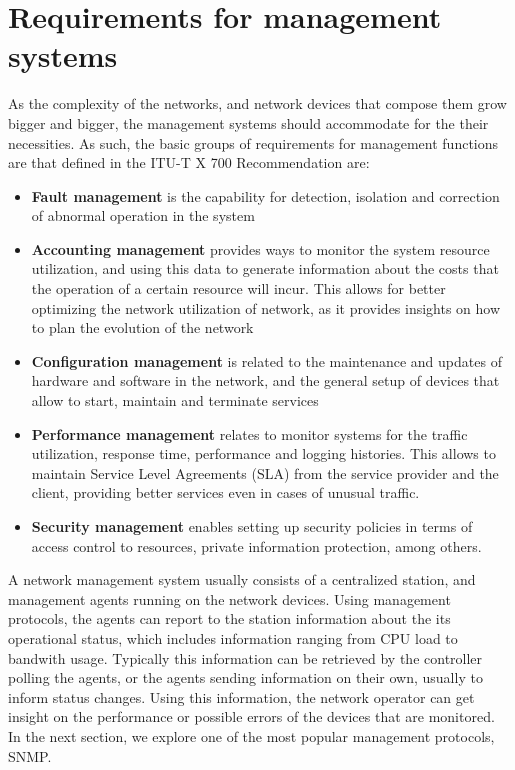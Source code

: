 \section {Requirements for management systems}

\par As the complexity of the networks, and network devices that compose them grow bigger and bigger, the management systems should accommodate for the their necessities. As such, the basic groups of requirements for management 
functions are that defined in the ITU-T X 700 Recommendation \cite {CITE - ITU T Recomendation} are:

\begin {itemize}
    \item \textbf {Fault management} is the capability for detection, isolation and correction of abnormal operation in the system
    \item \textbf {Accounting management} provides ways to monitor the system resource utilization, and using this data to generate information about the costs that the operation of a certain resource will incur. This 
        allows for better optimizing the network utilization of network, as it provides insights on how to plan the evolution of the network
    \item \textbf {Configuration management} is related to the maintenance and updates of hardware and software in the network, and the general setup of devices that allow to start, maintain and terminate services 
    \item \textbf {Performance management} relates to monitor systems for the traffic utilization, response time, performance and logging histories. This allows to maintain Service Level Agreements (SLA) from the service
        provider and the client, providing better services even in cases of unusual traffic.
    \item \textbf {Security management} enables setting up security policies in terms of access control to resources, private information protection, among others.
\end {itemize}


\par A network management system usually consists of a centralized station, and management agents running on the network devices. Using management protocols, the agents can report to the station information about the its operational 
status, which includes information ranging from CPU load to bandwith usage. Typically this information can be retrieved by the controller polling the agents, or the agents sending information on their own, usually to inform
status changes. Using this information, the network operator can get insight on the performance or possible errors of the devices that are monitored. In the next section, we explore one of the most popular management protocols,
SNMP.

